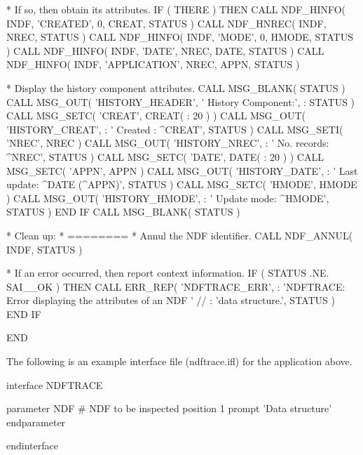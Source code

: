 \documentclass[twoside,11pt,nolof]{starlink}
\begin{document}
\begin{terminalv}
*  If so, then obtain its attributes.
      IF ( THERE ) THEN
         CALL NDF_HINFO( INDF, 'CREATED', 0, CREAT, STATUS )
         CALL NDF_HNREC( INDF, NREC, STATUS )
         CALL NDF_HINFO( INDF, 'MODE', 0,  HMODE, STATUS )
         CALL NDF_HINFO( INDF, 'DATE', NREC, DATE, STATUS )
         CALL NDF_HINFO( INDF, 'APPLICATION', NREC, APPN, STATUS )

*  Display the history component attributes.
         CALL MSG_BLANK( STATUS )
         CALL MSG_OUT( 'HISTORY_HEADER', '   History Component:',
     :                 STATUS )
         CALL MSG_SETC( 'CREAT', CREAT( : 20 ) )
         CALL MSG_OUT( 'HISTORY_CREAT',
     :                 '      Created    :  ^CREAT', STATUS )
         CALL MSG_SETI( 'NREC', NREC )
         CALL MSG_OUT( 'HISTORY_NREC',
     :                 '      No. records:  ^NREC', STATUS )
         CALL MSG_SETC( 'DATE', DATE( : 20 ) )
         CALL MSG_SETC( 'APPN', APPN )
         CALL MSG_OUT( 'HISTORY_DATE',
     :                 '      Last update:  ^DATE (^APPN)', STATUS )
         CALL MSG_SETC( 'HMODE', HMODE )
         CALL MSG_OUT( 'HISTORY_HMODE',
     :                 '      Update mode:  ^HMODE', STATUS )
      END IF
      CALL MSG_BLANK( STATUS )

*  Clean up:
*  ========
*  Annul the NDF identifier.
      CALL NDF_ANNUL( INDF, STATUS )

*  If an error occurred, then report context information.
      IF ( STATUS .NE. SAI__OK ) THEN
         CALL ERR_REP( 'NDFTRACE_ERR',
     :   'NDFTRACE: Error displaying the attributes of an NDF ' //
     :   'data structure.', STATUS )
      END IF

      END
\end{terminalv}
\normalsize

The following is an example  interface file
(ndftrace.ifl) for the application above.

\small
\begin{terminalv}
   interface NDFTRACE

      parameter NDF                 # NDF to be inspected
         position 1
         prompt   'Data structure'
      endparameter

   endinterface
\end{terminalv}
\normalsize
\end{document}
